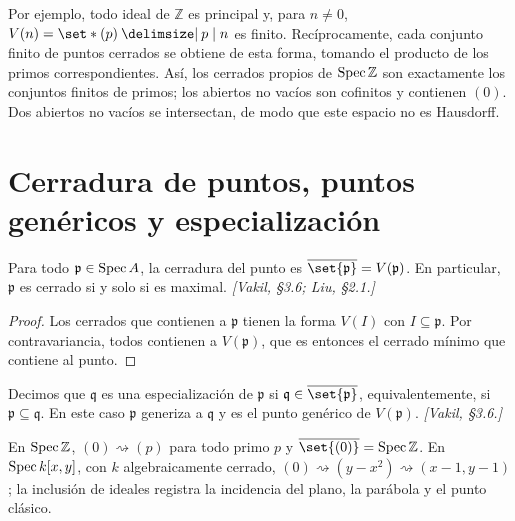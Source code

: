 \begin{ejem}
\label{ejem:s02-cerrados-z}
Por ejemplo, todo ideal de $\mathbb Z$ es principal y, para $n\ne0$, $V(n)=\set*{(p) \given p\mid n}$ es finito. Recíprocamente, cada conjunto finito de puntos cerrados se obtiene de esta forma, tomando el producto de los primos correspondientes. Así, los cerrados propios de $\operatorname{Spec}\mathbb Z$ son exactamente los conjuntos finitos de primos; los abiertos no vacíos son cofinitos y contienen $(0)$. Dos abiertos no vacíos se intersectan, de modo que este espacio no es Hausdorff.
\end{ejem}

\section{Cerradura de puntos, puntos genéricos y especialización}

\begin{prop}
\label{prop:s02-todo-p-cerradura-punto-p}
Para todo $\mathfrak p\in\operatorname{Spec} A$, la cerradura del punto es $\overline{\set{\mathfrak p}}=V(\mathfrak p)$. En particular, $\mathfrak p$ es cerrado si y solo si es maximal. \emph{[Vakil, \S3.6; Liu, \S2.1.]}
\end{prop}
\begin{proof}
Los cerrados que contienen a $\mathfrak p$ tienen la forma $V(I)$ con $I\subseteq\mathfrak p$. Por contravariancia, todos contienen a $V(\mathfrak p)$, que es entonces el cerrado mínimo que contiene al punto.
\end{proof}

\begin{defi}
\label{defi:s02-decimos-q-especializacion-p-q}
Decimos que $\mathfrak q$ es una especialización de $\mathfrak p$ si $\mathfrak q\in\overline{\set{\mathfrak p}}$, equivalentemente, si $\mathfrak p\subseteq\mathfrak q$. En este caso $\mathfrak p$ generiza a $\mathfrak q$ y es el punto genérico de $V(\mathfrak p)$. \emph{[Vakil, \S3.6.]}
\end{defi}

\begin{ejem}
\label{ejem:s02-z-0-p-todo-primo}
En $\operatorname{Spec}\mathbb Z$, $(0)\rightsquigarrow(p)$ para todo primo $p$ y $\overline{\set{(0)}}=\Spec\mathbb Z$. En $\operatorname{Spec} k[x,y]$, con $k$ algebraicamente cerrado, $(0)\rightsquigarrow(y-x^2)\rightsquigarrow(x-1,y-1)$; la inclusión de ideales registra la incidencia del plano, la parábola y el punto clásico.
\end{ejem}

